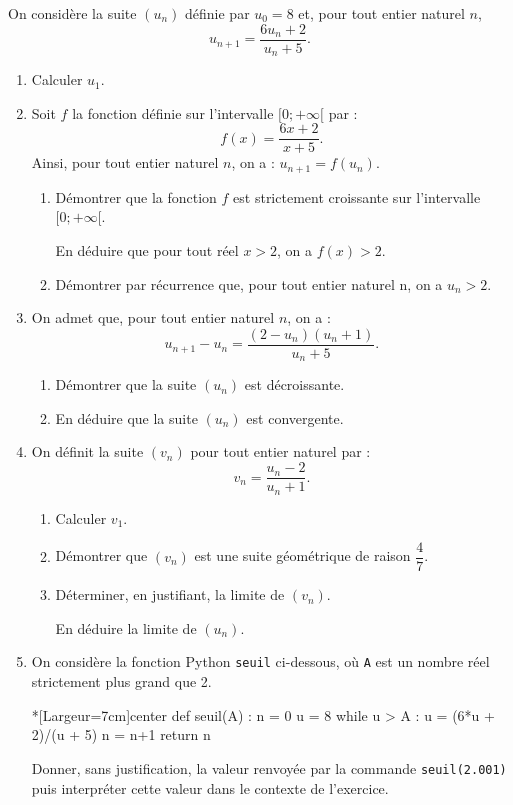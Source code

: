 On considère la suite $\left(u_n\right)$ définie par $u_0 = 8$ et, pour tout entier naturel $n$, \[u_{n +1} = \dfrac{6u_n + 2}{u_n +5}.\]

\begin{enumerate}
	\item Calculer $u_1$.
	\item Soit $f$ la fonction définie sur l'intervalle $[0;+\infty[$ par : \[f(x) = \dfrac{6x + 2 }{x +5}.\]
	Ainsi, pour tout entier naturel $n$, on a : $u_{n+1} = f\left(u_n\right)$.
	\begin{enumerate}
		\item Démontrer que la fonction $f$ est strictement croissante sur l'intervalle $[0;+\infty[$.
		
		En déduire que pour tout réel $x > 2$, on a $f(x) > 2$.
		\item Démontrer par récurrence que, pour tout entier naturel n, on a $u_n > 2$.
	\end{enumerate}
	\item On admet que, pour tout entier naturel $n$, on a : \[u_{n+1} - u_n = \dfrac{\left(2 - u_n\right)\left(u_n + 1\right)}{u_n +5}.\]
	\begin{enumerate}
		\item Démontrer que la suite $\left(u_n\right)$ est décroissante.
		\item En déduire que la suite $\left(u_n\right)$ est convergente.
	\end{enumerate}
	\item On définit la suite $\left(v_n\right)$ pour tout entier naturel par : \[v_n = \dfrac{u_n - 2}{u_n + 1}.\]
	\begin{enumerate}
		\item Calculer $v_1$.
		\item Démontrer que $\left(v_n\right)$ est une suite géométrique de raison $\dfrac47$.
		\item Déterminer, en justifiant, la limite de $\left(v_n\right)$.
		
		En déduire la limite de $\left(u_n\right)$.
	\end{enumerate}
	\item On considère la fonction \textsf{Python} \texttt{seuil} ci-dessous, où \texttt{A} est un nombre réel strictement plus grand que 2.
	
\begin{CodePythonLstAlt}*[Largeur=7cm]{center}
def seuil(A) :
	n = 0
	u = 8
	while u > A :
		u = (6*u + 2)/(u + 5)
		n = n+1
	return n
\end{CodePythonLstAlt}
	
	Donner, sans justification, la valeur renvoyée par la commande \texttt{seuil(2.001)} puis interpréter cette valeur dans le contexte de l'exercice.
\end{enumerate}
